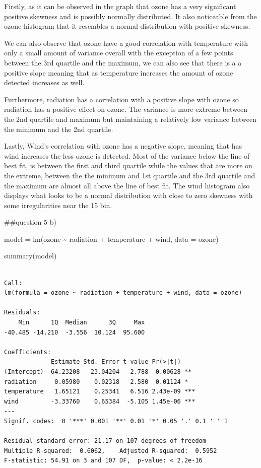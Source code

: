 \documentclass[
  a4paper,
  DIV=11,
  numbers=noendperiod]{scrartcl}
\newenvironment{Shaded}{\begin{snugshade}}{\end{snugshade}}
\newcommand{\AttributeTok}[1]{\textcolor[rgb]{0.40,0.45,0.13}{#1}}
\newcommand{\FunctionTok}[1]{\textcolor[rgb]{0.28,0.35,0.67}{#1}}
\newcommand{\NormalTok}[1]{\textcolor[rgb]{0.00,0.23,0.31}{#1}}
\newcommand{\OtherTok}[1]{\textcolor[rgb]{0.00,0.23,0.31}{#1}}
\newcommand{\SpecialCharTok}[1]{\textcolor[rgb]{0.37,0.37,0.37}{#1}}
\begin{document}
Firstly, as it can be observed in the graph that ozone has a very
significant positive skewness and is possibly normally distributed. It
also noticeable from the ozone histogram that it resembles a normal
distribution with positive skewness.

We can also observe that ozone have a good correlation with temperature
with only a small amount of variance overall with the exception of a few
points between the 3rd quartile and the maximum, we can also see that
there is a a positive slope meaning that as temperature increases the
amount of ozone detected increases as well.

Furthermore, radiation has a correlation with a positive slope with
ozone so radiation has a positive effect on ozone. The variance is more
extreme between the 2nd quartile and maximum but maintaining a
relatively low variance between the minimum and the 2nd quartile.

Lastly, Wind's correlation with ozone has a negative slope, meaning that
has wind increases the less ozone is detected. Most of the variance
below the line of best fit, is between the first and third quartile
while the values that are more on the extreme, between the the minimum
and 1st quartile and the 3rd quartile and the maximum are almost all
above the line of best fit. The wind histogram also displays what looks
to be a normal distribution with close to zero skewness with some
irregularities near the 15 bin.

\#\#question 5 b)

\begin{Shaded}
\begin{Highlighting}[]
\NormalTok{model }\OtherTok{=} \FunctionTok{lm}\NormalTok{(ozone }\SpecialCharTok{\textasciitilde{}}\NormalTok{ radiation }\SpecialCharTok{+}\NormalTok{ temperature }\SpecialCharTok{+}\NormalTok{ wind, }\AttributeTok{data =}\NormalTok{ ozone)}

\FunctionTok{summary}\NormalTok{(model)}
\end{Highlighting}
\end{Shaded}

\begin{verbatim}

Call:
lm(formula = ozone ~ radiation + temperature + wind, data = ozone)

Residuals:
    Min      1Q  Median      3Q     Max 
-40.485 -14.210  -3.556  10.124  95.600 

Coefficients:
             Estimate Std. Error t value Pr(>|t|)    
(Intercept) -64.23208   23.04204  -2.788  0.00628 ** 
radiation     0.05980    0.02318   2.580  0.01124 *  
temperature   1.65121    0.25341   6.516 2.43e-09 ***
wind         -3.33760    0.65384  -5.105 1.45e-06 ***
---
Signif. codes:  0 '***' 0.001 '**' 0.01 '*' 0.05 '.' 0.1 ' ' 1

Residual standard error: 21.17 on 107 degrees of freedom
Multiple R-squared:  0.6062,    Adjusted R-squared:  0.5952 
F-statistic: 54.91 on 3 and 107 DF,  p-value: < 2.2e-16
\end{verbatim}
\end{document}
